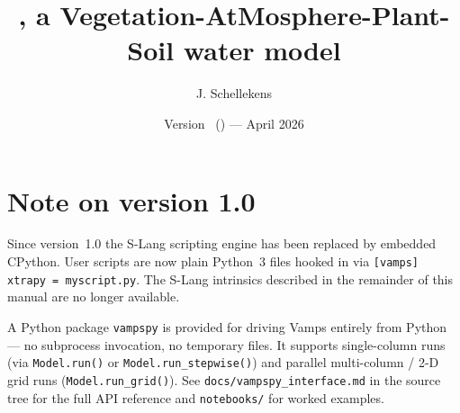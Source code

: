 \documentclass[11pt]{book}
\title{\vamps, a Vegetation-AtMosphere-Plant-Soil water model}
\author{J. Schellekens}
\date{Version \vampsversion\ (\vampsstatus{}) --- April 2026}
\newcommand{\vamps}{{\sf Vamps}}
\begin{document}

\maketitle

\section*{Note on version 1.0}

Since version~1.0 the S-Lang scripting engine has been replaced by embedded
CPython.  User scripts are now plain Python~3 files hooked in via
\texttt{[vamps] xtrapy = myscript.py}.  The S-Lang intrinsics described
in the remainder of this manual are no longer available.

A Python package \texttt{vampspy} is provided for driving \vamps{} entirely
from Python --- no subprocess invocation, no temporary files.  It supports
single-column runs (via \texttt{Model.run()} or \texttt{Model.run\_stepwise()})
and parallel multi-column / 2-D grid runs (\texttt{Model.run\_grid()}).
See \texttt{docs/vampspy\_interface.md} in the source tree for the full API
reference and \texttt{notebooks/} for worked examples.
\end{document}
